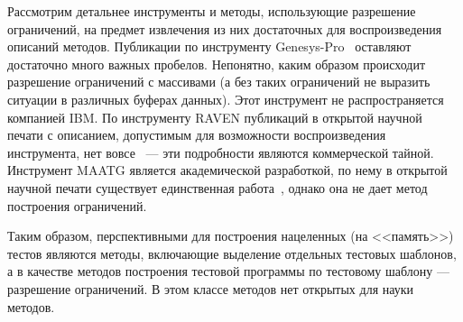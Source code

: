 

Рассмотрим детальнее инструменты и методы, использующие разрешение ограничений, на предмет извлечения из них достаточных для воспроизведения описаний методов. Публикации по инструменту Genesys-Pro~\cite{GenesysPro, GenesysPro2004Innovations, GenesysSolver} оставляют достаточно много важных пробелов. Непонятно, каким образом происходит разрешение ограничений с массивами (а без таких ограничений не выразить ситуации в различных буферах данных). Этот инструмент не распространяется компанией IBM. По инструменту RAVEN публикаций в открытой научной печати с описанием, допустимым для возможности воспроизведения инструмента, нет вовсе~\cite{RAVEN} --- эти подробности являются коммерческой тайной. Инструмент MAATG является академической разработкой, по нему в открытой научной печати существует единственная работа~\cite{MAATG}, однако она не дает метод построения ограничений.

Таким образом, перспективными для построения нацеленных (на <<память>>) тестов являются  методы, включающие выделение отдельных тестовых шаблонов, а в качестве методов построения тестовой программы по тестовому шаблону --- разрешение ограничений. В этом классе методов нет открытых для науки методов.


